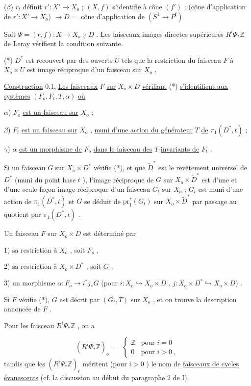 ($\beta$) $r_t$ définit $r' : X' \longrightarrow X_o$ ; $(X, f)$ s'identifie à
cône $(f')$ : (cône d'application de $r' : X' \longrightarrow X_o$) $\longrightarrow D =$ cône d'application de $(S^1 \to P^t)$

Soit $\Psi = (r, f) : X \longrightarrow X_o \times D$ . Les faisceaux images directes supérieures $R^i \Psi_* \mathbb{Z}$ de Leray vérifient la condition suivante.

(*)  $D^*$ est recouvert par des ouverts $U$ tels que la restriction du faisceau $F$ à $X_o \times U$ est image réciproque d'un faisceau sur $X_o$ .

\underline{Construction} 0.1, \underline{Les faisceaux} $F$ \underline{sur} $X_o \times D$ \underline{vérifiant} (*) \underline{s'identifient aux systèmes} $(F_o, F_t, T, \alpha)$ \underline{où}

$\alpha$)  $F_o$  \underline{est un faisceau sur} $X_o$  ;

$\beta$)  $F_t$  \underline{est un faisceau sur} $X_o$  , \underline{muni d'une action du générateur} $T$ \underline{de} $\pi_1(D^*,t)$ ;

$\gamma$)  $\alpha$  \underline{est un morphisme de} $F_o$ \underline{dans le faisceau des} $T$-\underline{invariants de} $F_t$ .

Si un faisceau $G$ sur $X_o \times D^*$ vérifie (*), et que $\widetilde{D}^*$ est le revêtement universel de $D^*$ (muni du point base $t$ ), l'image réciproque de $G$ sur $X_o \times \widetilde{D}^*$ est d'une et d'une seule façon image réciproque d'un faisceau $G_t$ sur $X_o$  ; $G_t$ est muni d'une action de $\pi_1(D^*, t)$ et $G$ se déduit de $\mathrm{pr}_1^*(G_t)$ sur $X_o \times \widetilde{D}^*$ par passage au quotient par $\pi_1(D^*, t)$ .

Un faisceau $F$ sur $X_o \times D$ est déterminé par

1) sa restriction à $X_o$ , soit $F_o$ ,

2) sa restriction à $X_o \times D^*$ , soit $G$ ,

3) un morphisme $\alpha : F_o \longrightarrow i^*j_*G$ (pour $i : X_o \hookrightarrow X_o \times D$ , $j : X_o \times D^* \hookrightarrow X_o \times D$) .

Si $F$ vérifie (*), $G$ est décrit par $(G_t, T)$ sur $X_o$ , et on trouve la description annoncée de $F$ .

Pour les faisceau $R^i \Psi_* \mathbb{Z}$ , on a

\begin{equation*}
(R^i \Psi_* \mathbb{Z})_o \;=\; \begin{cases} \mathbb{Z} & \text{pour } i = 0 \\ 0 & \text{pour } i > 0 \ , \end{cases}
\end{equation*}
tandis que les $(R^i \Psi_* \mathbb{Z} )_t$ méritent (pour $i > 0$ ) le nom de \underline{faisceaux de cycles évanescents} (cf. la discussion au début du paragraphe 2 de I).


